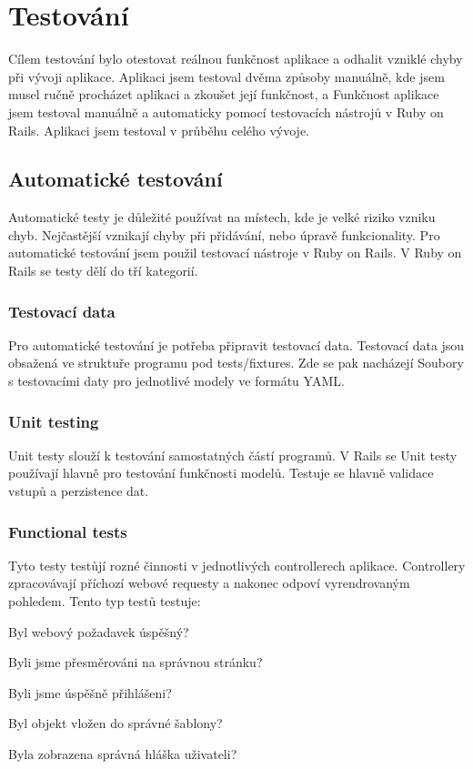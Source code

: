 \chapter{Testování}

Cílem testování bylo otestovat reálnou funkčnost aplikace a odhalit vzniklé chyby  při vývoji aplikace. Aplikaci jsem testoval dvěma způsoby manuálně, kde jsem musel ručně procházet aplikaci a zkoušet její funkčnost, a  Funkčnost aplikace jsem testoval manuálně a automaticky pomocí testovacích nástrojů v Ruby on Rails. Aplikaci jsem testoval v průběhu celého vývoje.  

\section{Automatické testování}
Automatické testy je důležité používat na místech, kde je velké riziko vzniku chyb. Nejčastější vznikají chyby při přidávání, nebo úpravě funkcionality.
Pro automatické testování jsem použil testovací nástroje v Ruby on Rails.
V Ruby on Rails se testy dělí do tří kategorií.

\subsection{Testovací data}
Pro automatické testování je potřeba připravit testovací data. Testovací data jsou obsažená ve struktuře programu pod tests/fixtures. Zde se pak nacházejí Soubory s testovacími daty pro jednotlivé modely ve formátu YAML.

\subsection{Unit testing}
Unit testy slouží k testování samostatných částí programů. V Rails se Unit testy používají hlavně pro testování funkčnosti modelů. Testuje se hlavně validace vstupů a perzistence dat.

\subsection{Functional tests}
Tyto testy testůjí rozné činnosti v jednotlivých controllerech aplikace. Controllery zpracovávají příchozí webové requesty a nakonec odpoví vyrendrovaným pohledem. Tento typ testů testuje:

\begin{list}{•}{}
\item Byl webový požadavek úspěšný?
\item Byli jsme přesměrováni na správnou stránku?
\item Byli jsme úspěšně přihlášeni?
\item Byl objekt vložen do správné šablony?
\item Byla zobrazena správná hláška uživateli?
\end{list} 


